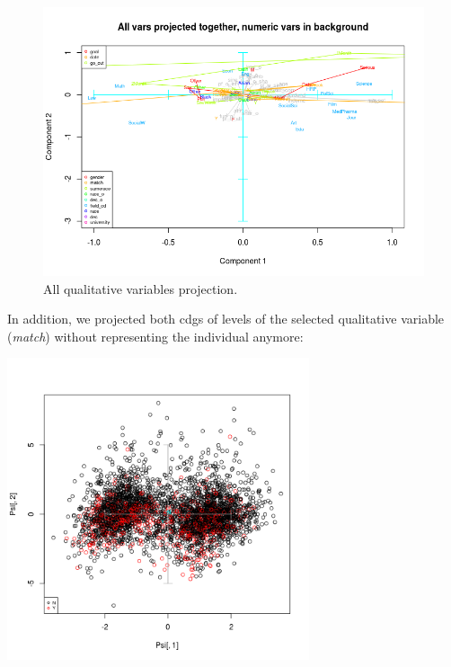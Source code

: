 
\begin{figure}
  \includegraphics[width=\linewidth ,scale = 0.1]{images/ACP/all_together.png}
  \caption{All qualitative variables projection.}
  \label{fig:projall}
\end{figure}


In addition, we projected both cdgs of levels of the selected qualitative variable (\textit{match}) without representing the individual anymore:

\begin{center}
\includegraphics[width=3.5in]{images/ACP/x-1_y-2b-2-match-ill-proj.png}
\label{fig:aLabelForReferencing}
\end{center}

